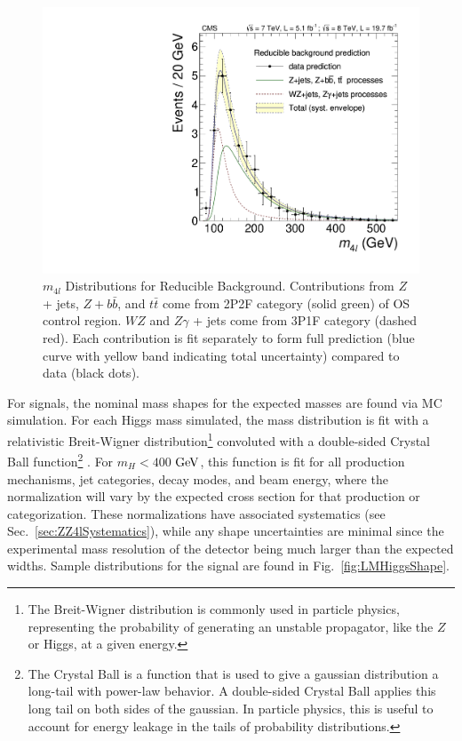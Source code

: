 \begin{figure}[htbp]
\begin{center}
\includegraphics[width=.6\linewidth]{HiggsDiscovery/figures/PredictedComponentsSR_withData_PAPER.pdf}
\caption[Reducible Background Mass Shapes]{$m_{4l}$ Distributions for Reducible Background. Contributions from $Z$ + jets, $Z+b\bar{b}$, and $t\bar{t}$ come from 2P2F category (solid green) of OS control region. $WZ$ and $Z\gamma$ + jets come from 3P1F category (dashed red). Each contribution is fit separately to form full prediction (blue curve with yellow band indicating total uncertainty) compared to data (black dots).}
\label{fig:ZXMassShapes}
\end{center}
\end{figure}

For signals, the nominal mass shapes for the expected masses are found via MC simulation. For each Higgs mass simulated, the mass distribution is fit with a relativistic Breit-Wigner distribution\footnote{The Breit-Wigner distribution is commonly used in particle physics, representing the probability of generating an unstable propagator, like the $Z$ or Higgs, at a given energy.} convoluted with a double-sided Crystal Ball function\footnote{The Crystal Ball is a function that is used to give a gaussian distribution a long-tail with power-law behavior. A double-sided Crystal Ball applies this long tail on both sides of the gaussian. In particle physics, this is useful to account for energy leakage in the tails of probability distributions.} \cite{}. For $m_H < 400$ $\rm{GeV}$, this function is fit for all production mechanisms, jet categories, decay modes, and beam energy, where the normalization will vary by the expected cross section for that production or categorization. These normalizations have associated systematics (see Sec.~\ref{sec:ZZ4lSystematics}), while any shape uncertainties are minimal since the experimental mass resolution of the detector being much larger than the expected widths. Sample distributions for the signal are found in Fig.~\ref{fig:LMHiggsShape}.

